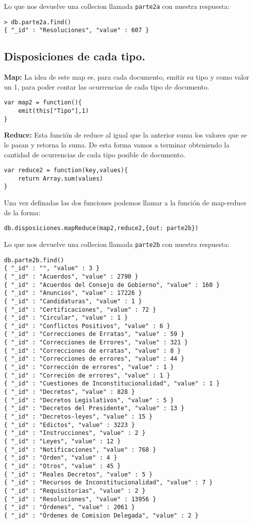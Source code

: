 Lo que nos devuelve una collecion llamada \texttt{parte2a} con nuestra respuesta:

\begin{lstlisting}
> db.parte2a.find()
{ "_id" : "Resoluciones", "value" : 607 }
\end{lstlisting}

\subsection{Disposiciones de cada tipo.}
\textbf{Map:}
La idea de este map es, para cada documento, emitir su tipo y como valor un 1, para poder contar las ocurrencias
de cada tipo de documento.

\begin{lstlisting}
var map2 = function(){
	emit(this["Tipo"],1)
}
\end{lstlisting}

\textbf{Reduce:}
Esta función de reduce al igual que la anterior suma los valores que se le pasan y retorna la suma. De esta forma vamos a terminar
obteniendo la cantidad de ocurrencias de cada tipo posible de documento.
\begin{lstlisting}
var reduce2 = function(key,values){
	return Array.sum(values)
}
\end{lstlisting}

Una vez definadas las dos funciones podemos llamar a la función de map-reduce de la forma:
\begin{lstlisting}
db.disposiciones.mapReduce(map2,reduce2,{out: parte2b})
\end{lstlisting}

Lo que nos devuelve una collecion llamada \texttt{parte2b} con nuestra respuesta:

\begin{lstlisting}
db.parte2b.find()
{ "_id" : "", "value" : 3 }
{ "_id" : "Acuerdos", "value" : 2790 }
{ "_id" : "Acuerdos del Consejo de Gobierno", "value" : 160 }
{ "_id" : "Anuncios", "value" : 17226 }
{ "_id" : "Candidaturas", "value" : 1 }
{ "_id" : "Certificaciones", "value" : 72 }
{ "_id" : "Circular", "value" : 1 }
{ "_id" : "Conflictos Positivos", "value" : 6 }
{ "_id" : "Correcciones de Erratas", "value" : 59 }
{ "_id" : "Correcciones de Errores", "value" : 321 }
{ "_id" : "Correcciones de erratas", "value" : 8 }
{ "_id" : "Correcciones de errores", "value" : 44 }
{ "_id" : "Corrección de errores", "value" : 1 }
{ "_id" : "Correción de errores", "value" : 1 }
{ "_id" : "Cuestiones de Inconstitucionalidad", "value" : 1 }
{ "_id" : "Decretos", "value" : 828 }
{ "_id" : "Decretos Legislativos", "value" : 5 }
{ "_id" : "Decretos del Presidente", "value" : 13 }
{ "_id" : "Decretos-leyes", "value" : 15 }
{ "_id" : "Edictos", "value" : 3223 }
{ "_id" : "Instrucciones", "value" : 2 }
{ "_id" : "Leyes", "value" : 12 }
{ "_id" : "Notificaciones", "value" : 768 }
{ "_id" : "Orden", "value" : 4 }
{ "_id" : "Otros", "value" : 45 }
{ "_id" : "Reales Decretos", "value" : 5 }
{ "_id" : "Recursos de Inconstitucionalidad", "value" : 7 }
{ "_id" : "Requisitorias", "value" : 2 }
{ "_id" : "Resoluciones", "value" : 13956 }
{ "_id" : "Órdenes", "value" : 2061 }
{ "_id" : "Órdenes de Comision Delegada", "value" : 2 }
\end{lstlisting}

